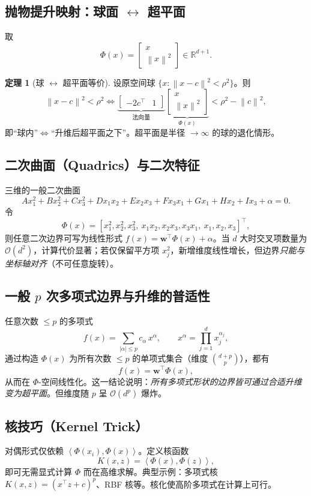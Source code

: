 \documentclass[10.5pt,hyperref,a4paper,UTF8]{ctexart}
\newcommand{\R}{\mathbb{R}}
\newcommand{\norm}[1]{\left\lVert #1\right\rVert}
\newcommand{\inner}[2]{\left\langle #1,#2\right\rangle}
\theoremstyle{definition}
\newtheorem{theorem}{定理}
\begin{document}
\subsection{抛物提升映射：球面 \(\leftrightarrow\) 超平面}
取
\[
\Phi(x)=\begin{bmatrix}x\\ \norm{x}^2\end{bmatrix}\in\R^{d+1}.
\]
\begin{theorem}[球 \(\leftrightarrow\) 超平面等价]
设原空间球 $\{x:\norm{x-c}^2<\rho^2\}$。则
\[
\norm{x-c}^2<\rho^2
\iff
\underbrace{\begin{bmatrix}-2c^\top&1\end{bmatrix}}_{\text{法向量}}
\underbrace{\begin{bmatrix}x\\ \norm{x}^2\end{bmatrix}}_{\Phi(x)}
<\rho^2-\norm{c}^2,
\]
即“球内”$\Leftrightarrow$“升维后超平面之下”。超平面是半径 $\to\infty$ 的球的退化情形。
\end{theorem}

\subsection{二次曲面（Quadrics）与二次特征}
三维的一般二次曲面
\[
Ax_1^2+Bx_2^2+Cx_3^2+Dx_1x_2+Ex_2x_3+Fx_3x_1+Gx_1+Hx_2+Ix_3+\alpha=0.
\]
令
\[
\Phi(x)=[x_1^2,x_2^2,x_3^2,\ x_1x_2,x_2x_3,x_3x_1,\ x_1,x_2,x_3]^\top,
\]
则任意二次边界可写为线性形式 $f(x)=\bm w^\top\Phi(x)+\alpha$。当 $d$ 大时交叉项数量为 $\mathcal{O}(d^2)$，计算代价显著；若仅保留平方项 $x_j^2$，新增维度线性增长，但边界\emph{只能与坐标轴对齐}（不可任意旋转）。

\subsection{一般 $p$ 次多项式边界与升维的普适性}
任意次数 $\le p$ 的多项式
\[
f(x)=\sum_{|\alpha|\le p} c_\alpha\,x^\alpha,\qquad x^\alpha=\prod_{j=1}^dx_j^{\alpha_j},
\]
通过构造 $\Phi(x)$ 为所有次数 $\le p$ 的单项式集合（维度 $\binom{d+p}{p}$），都有
\[
f(x)=\bm w^\top\Phi(x),
\]
从而在 $\Phi$-空间线性化。这一结论说明：\emph{所有多项式形状的边界皆可通过合适升维变为超平面}。但维度随 $p$ 呈 $\mathcal{O}(d^p)$ 爆炸。

\subsection{核技巧（Kernel Trick）}
对偶形式仅依赖 $\inner{\Phi(x_i)}{\Phi(x)}$。定义核函数
\[
K(x,z)=\inner{\Phi(x)}{\Phi(z)},
\]
即可无需显式计算 $\Phi$ 而在高维求解。典型示例：多项式核 $K(x,z)=(x^\top z+c)^p$、RBF 核等。核化使高阶多项式在计算上可行。
\end{document}
